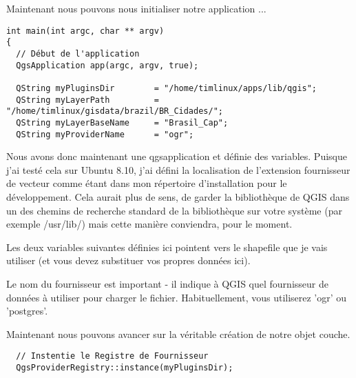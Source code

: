 Maintenant nous pouvons nous initialiser notre application ...

\begin{verbatim}
int main(int argc, char ** argv)
{
  // Début de l'application
  QgsApplication app(argc, argv, true);

  QString myPluginsDir        = "/home/timlinux/apps/lib/qgis";
  QString myLayerPath         = "/home/timlinux/gisdata/brazil/BR_Cidades/";
  QString myLayerBaseName     = "Brasil_Cap";
  QString myProviderName      = "ogr";

\end{verbatim}

Nous avons donc maintenant une qgsapplication et définie des variables. Puisque 
j'ai testé cela sur Ubuntu 8.10, j'ai défini la localisation de l'extension 
fournisseur de vecteur comme étant dans mon répertoire d'installation pour le 
développement. Cela aurait plus de sens, de garder la bibliothèque de QGIS dans 
un des chemins de recherche standard de la bibliothèque sur votre système (par 
exemple /usr/lib/) mais cette manière conviendra, pour le moment.

Les deux variables suivantes définies ici pointent vers le shapefile que je vais 
utiliser (et vous devez substituer vos propres données ici).

Le nom du fournisseur est important - il indique à QGIS quel fournisseur de 
données à utiliser pour charger le fichier. Habituellement, vous utiliserez
 'ogr' ou 'postgres'.

Maintenant nous pouvons avancer sur la véritable création de notre objet couche.

\begin{verbatim}
  // Instentie le Registre de Fournisseur
  QgsProviderRegistry::instance(myPluginsDir);
\end{verbatim}

